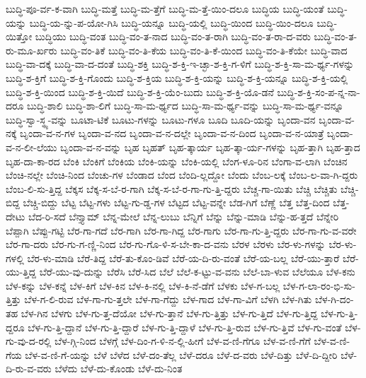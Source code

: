 {ಬುದ್ಧಿ-ಪೂ-ರ್ವ-ಕ-ವಾಗಿ
ಬುದ್ಧಿ-ಮತ್ತೆ
ಬುದ್ಧಿ-ಮ-ತ್ತೆಗೆ
ಬುದ್ಧಿ-ಮ-ತ್ತೆ-ಯಿಂ-ದಲೂ
ಬುದ್ಧಿಯ
ಬುದ್ಧಿ-ಯಂತೆ
ಬುದ್ಧಿ-ಯನ್ನು
ಬುದ್ಧಿ-ಯ-ನ್ನು-ಪ-ಯೋ-ಗಿಸಿ
ಬುದ್ಧಿ-ಯನ್ನೂ
ಬುದ್ಧಿ-ಯಲ್ಲಿ
ಬುದ್ಧಿ-ಯಿಂದ
ಬುದ್ಧಿ-ಯಿಂ-ದಲೂ
ಬುದ್ಧಿ-ಯಿತ್ತೋ
ಬುದ್ಧಿಯು
ಬುದ್ಧಿ-ವಂತ
ಬುದ್ಧಿ-ವಂ-ತ-ನಾದ
ಬುದ್ಧಿ-ವಂ-ತ-ರಾಗಿ
ಬುದ್ಧಿ-ವಂ-ತ-ರಾ-ದ-ವರು
ಬುದ್ಧಿ-ವಂ-ತ-ರು-ಮೂ-ರ್ಖರು
ಬುದ್ಧಿ-ವಂ-ತಿಕೆ
ಬುದ್ಧಿ-ವಂ-ತಿ-ಕೆಯ
ಬುದ್ಧಿ-ವಂ-ತಿ-ಕೆ-ಯಿಂದ
ಬುದ್ಧಿ-ವಂ-ತಿ-ಕೆಯೇ
ಬುದ್ಧಿ-ವಾದ
ಬುದ್ಧಿ-ವಾ-ದಕ್ಕೆ
ಬುದ್ಧಿ-ವಾ-ದ-ದಂತೆ
ಬುದ್ಧಿ-ಶಕ್ತಿ
ಬುದ್ಧಿ-ಶ-ಕ್ತಿ-ಇ-ಚ್ಛಾ-ಶ-ಕ್ತಿ-ಗ-ಳಿಗೆ
ಬುದ್ಧಿ-ಶ-ಕ್ತಿ-ಸಾ-ಮ-ರ್ಥ್ಯ-ಗಳನ್ನು
ಬುದ್ಧಿ-ಶ-ಕ್ತಿಗೆ
ಬುದ್ಧಿ-ಶ-ಕ್ತಿ-ಗೊಂದು
ಬುದ್ಧಿ-ಶ-ಕ್ತಿಯ
ಬುದ್ಧಿ-ಶ-ಕ್ತಿ-ಯನ್ನು
ಬುದ್ಧಿ-ಶ-ಕ್ತಿ-ಯನ್ನೂ
ಬುದ್ಧಿ-ಶ-ಕ್ತಿ-ಯಲ್ಲಿ
ಬುದ್ಧಿ-ಶ-ಕ್ತಿ-ಯಿಂದ
ಬುದ್ಧಿ-ಶ-ಕ್ತಿ-ಯಿದೆ
ಬುದ್ಧಿ-ಶ-ಕ್ತಿ-ಯೆಂ-ಬುದು
ಬುದ್ಧಿ-ಶ-ಕ್ತಿ-ಯೊ-ಡನೆ
ಬುದ್ಧಿ-ಶ-ಕ್ತಿ-ಸಂ-ಪ-ನ್ನ-ನಾ-ದರೂ
ಬುದ್ಧಿ-ಶಾಲಿ
ಬುದ್ಧಿ-ಶಾ-ಲಿಗೆ
ಬುದ್ಧಿ-ಸಾ-ಮ-ರ್ಥ್ಯದ
ಬುದ್ಧಿ-ಸಾ-ಮ-ರ್ಥ್ಯ-ವನ್ನು
ಬುದ್ಧಿ-ಸಾ-ಮ-ರ್ಥ್ಯ-ವನ್ನೂ
ಬುದ್ಧಿ-ಸ್ವಾ-ಸ್ಥ್ಯ-ವನ್ನು
ಬೂಟಾ-ಟಿಕೆ
ಬೂಟು-ಗಳನ್ನು
ಬೂಟು-ಗಳೂ
ಬೂದಿ
ಬೂದಿ-ಯನ್ನು
ಬೃಂದಾ-ವನ
ಬೃಂದಾ-ವ-ನಕ್ಕೆ
ಬೃಂದಾ-ವ-ನ-ಗಳ
ಬೃಂದಾ-ವ-ನದ
ಬೃಂದಾ-ವ-ನ-ದಲ್ಲೇ
ಬೃಂದಾ-ವ-ನ-ದಿಂದ
ಬೃಂದಾ-ವ-ನ-ಯಾತ್ರೆ
ಬೃಂದಾ-ವ-ನ-ಲೀ-ಲೆಯು
ಬೃಂದಾ-ವ-ನ-ವನ್ನು
ಬೃಹ
ಬೃಹತ್
ಬೃಹ-ತ್ಕಾರ್ಯ
ಬೃಹ-ತ್ಕಾ-ರ್ಯ-ಗಳನ್ನು
ಬೃಹ-ತ್ತಾಗಿ
ಬೃಹ-ತ್ತಾದ
ಬೃಹ-ದಾ-ಕಾ-ರದ
ಬೆಂಕಿ
ಬೆಂಕಿಗೆ
ಬೆಂಕಿಯ
ಬೆಂಕಿ-ಯನ್ನು
ಬೆಂಕಿ-ಯಲ್ಲಿ
ಬೆಂಗ-ಳೂ-ರಿನ
ಬೆಂಗಾ-ವ-ಲಾಗಿ
ಬೆಂಚಿನ
ಬೆಂಚಿ-ನಲ್ಲೇ
ಬೆಂಚಿ-ನಿಂದ
ಬೆಂಚು-ಗಳ
ಬೆಂಡಾದ
ಬೆಂದ
ಬೆಂದಿ-ಲ್ಲದ್ದೋ
ಬೆಂದು
ಬೆಂಬ-ಲಕ್ಕೆ
ಬೆಂಬ-ಲ-ವಾ-ಗಿ-ದ್ದರು
ಬೆಂಬ-ಲಿ-ಸು-ತ್ತಿದ್ದ
ಬೆಕ್ಕಸ
ಬೆಕ್ಕ-ಸ-ಬೆ-ರ-ಗಾಗಿ
ಬೆಕ್ಕ-ಸ-ಬೆ-ರ-ಗಾ-ಗು-ತ್ತಿ-ದ್ದರು
ಬೆಚ್ಚ-ಗಾ-ಯಿತು
ಬೆಚ್ಚಿ
ಬೆಚ್ಚಿತು
ಬೆಚ್ಚಿ-ಬಿದ್ದ
ಬೆಚ್ಚಿ-ಬಿದ್ದು
ಬೆಟ್ಟ
ಬೆಟ್ಟ-ಗಳು
ಬೆಟ್ಟ-ಗು-ಡ್ಡ-ಗಳ
ಬೆಟ್ಟದ
ಬೆಟ್ಟ-ವನ್ನೇ
ಬೆಡ-ಗಿಗೆ
ಬೆಣ್ಣೆ
ಬೆತ್ತ
ಬೆತ್ತ-ದಿಂದ
ಬೆತ್ತ-ದೇಟು
ಬೆದ-ರಿ-ಸದೆ
ಬೆನ್ತ್ಯಾಮ್
ಬೆನ್ನ-ಮೇಲೆ
ಬೆನ್ನ-ಲುಬು
ಬೆನ್ನಿಗೆ
ಬೆನ್ನು
ಬೆನ್ನು-ಮಾಡಿ
ಬೆನ್ನು-ಹ-ತ್ತದೆ
ಬೆನ್ನೇರಿ
ಬೆಪ್ಪಾಗಿ
ಬೆಪ್ಪು-ಗಟ್ಟಿ
ಬೆರ-ಗಾ-ಗದೆ
ಬೆರ-ಗಾಗಿ
ಬೆರ-ಗಾ-ಗಿದ್ದ
ಬೆರ-ಗಾಗು
ಬೆರ-ಗಾ-ಗು-ತ್ತಿ-ದ್ದರು
ಬೆರ-ಗಾ-ಗು-ವ-ವರೇ
ಬೆರ-ಗಾ-ದರು
ಬೆರ-ಗು-ಗ-ಣ್ಣಿ-ನಿಂದ
ಬೆರ-ಗು-ಗೊ-ಳಿ-ಸ-ಬೇ-ಕಾ-ದ-ವನು
ಬೆರಳ
ಬೆರಳು
ಬೆರ-ಳು-ಗಳನ್ನು
ಬೆರ-ಳು-ಗಳಲ್ಲಿ
ಬೆರ-ಳು-ಮಾಡಿ
ಬೆರೆ-ತಿದ್ದ
ಬೆರೆ-ತು-ಕೊಂ-ಡಿವೆ
ಬೆರೆ-ಯ-ದಿ-ರು-ವಂತೆ
ಬೆರೆ-ಯ-ಬಲ್ಲ
ಬೆರೆ-ಯು-ತ್ತಾರೆ
ಬೆರೆ-ಯು-ತ್ತಿದ್ದ
ಬೆರೆ-ಯು-ವು-ದುನ್ನು
ಬೆರೆಸಿ
ಬೆರೆ-ಸಿದ
ಬೆಲೆ
ಬೆಲೆ-ಕ-ಟ್ಟು-ವ-ವನು
ಬೆಲೆ-ಬಾ-ಳುವ
ಬೆಲೆಯೂ
ಬೆಳ-ಕನು
ಬೆಳ-ಕನ್ನು
ಬೆಳ-ಕನ್ನೆ
ಬೆಳ-ಕಿಗೆ
ಬೆಳ-ಕಿನ
ಬೆಳ-ಕಿ-ನಲ್ಲಿ
ಬೆಳ-ಕಿ-ನೆ-ಡೆಗೆ
ಬೆಳಕು
ಬೆಳ-ಗ-ಬಲ್ಲ
ಬೆಳ-ಗ-ಲಾ-ರಂ-ಭಿ-ಸು-ತ್ತಿತ್ತು
ಬೆಳ-ಗ-ಲಿ-ರುವ
ಬೆಳ-ಗಾ-ಗು-ತ್ತಲೇ
ಬೆಳ-ಗಾ-ಗೆದ್ದು
ಬೆಳ-ಗಾದ
ಬೆಳ-ಗಾ-ವಿಗೆ
ಬೆಳಗಿ
ಬೆಳ-ಗಿತು
ಬೆಳ-ಗಿ-ದಂ-ತಹ
ಬೆಳ-ಗಿನ
ಬೆಳಗು
ಬೆಳ-ಗು-ತ್ತ-ದೆಯೋ
ಬೆಳ-ಗು-ತ್ತಾನೆ
ಬೆಳ-ಗು-ತ್ತಿತ್ತು
ಬೆಳ-ಗು-ತ್ತಿದೆ
ಬೆಳ-ಗು-ತ್ತಿದ್ದ
ಬೆಳ-ಗು-ತ್ತಿ-ದ್ದರೂ
ಬೆಳ-ಗು-ತ್ತಿ-ದ್ದಾನೆ
ಬೆಳ-ಗು-ತ್ತಿ-ದ್ದಾರೆ
ಬೆಳ-ಗು-ತ್ತಿ-ದ್ದಾಳೆ
ಬೆಳ-ಗು-ತ್ತಿ-ರುವ
ಬೆಳ-ಗು-ತ್ತಿವೆ
ಬೆಳ-ಗು-ವಂತೆ
ಬೆಳ-ಗು-ವು-ದ-ರಲ್ಲಿ
ಬೆಳ-ಗ್ಗಿ-ನಿಂದ
ಬೆಳಗ್ಗೆ
ಬೆಳ-ದಿಂ-ಗ-ಳಿ-ನ-ಲ್ಲಿ-ಹೀಗೆ
ಬೆಳ-ವ-ಣಿ-ಗೆಗೂ
ಬೆಳ-ವ-ಣಿ-ಗೆಗೆ
ಬೆಳ-ವ-ಣಿ-ಗೆಯ
ಬೆಳ-ವ-ಣಿ-ಗೆ-ಯನ್ನು
ಬೆಳೆ
ಬೆಳೆದ
ಬೆಳೆ-ದಂ-ತೆಲ್ಲ
ಬೆಳೆ-ದರೂ
ಬೆಳೆ-ದ-ವರು
ಬೆಳೆ-ದಿತ್ತು
ಬೆಳೆ-ದಿ-ದ್ದೀರಿ
ಬೆಳೆ-ದಿ-ರು-ವ-ವರು
ಬೆಳೆದು
ಬೆಳೆ-ದು-ಕೊಂಡು
ಬೆಳೆ-ದು-ನಿಂತ
}
